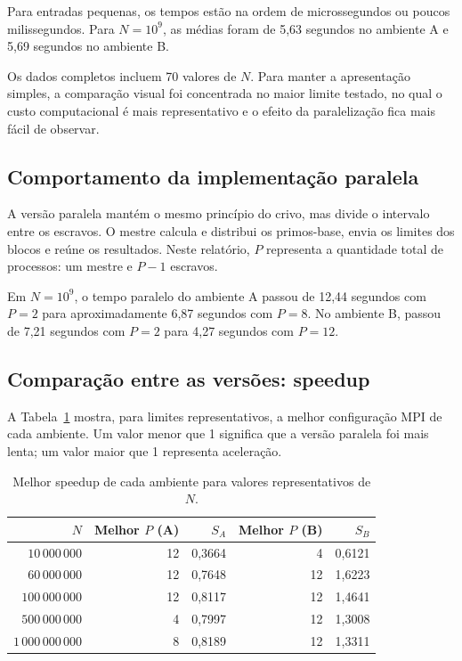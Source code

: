 \documentclass[12pt,a4paper]{article}
\begin{document}
Para entradas pequenas, os tempos estão na ordem de microssegundos ou poucos
milissegundos. Para $N=10^9$, as médias foram de 5,63 segundos no ambiente A e
5,69 segundos no ambiente B.

Os dados completos incluem 70 valores de $N$. Para manter a apresentação
simples, a comparação visual foi concentrada no maior limite testado, no qual
o custo computacional é mais representativo e o efeito da paralelização fica
mais fácil de observar.

\subsection{Comportamento da implementação paralela}

A versão paralela mantém o mesmo princípio do crivo, mas divide o intervalo
entre os escravos. O mestre calcula e distribui os primos-base, envia os
limites dos blocos e reúne os resultados. Neste relatório, $P$ representa a
quantidade total de processos: um mestre e $P-1$ escravos.

Em $N=10^9$, o tempo paralelo do ambiente A passou de 12,44 segundos com
$P=2$ para aproximadamente 6,87 segundos com $P=8$. No ambiente B, passou de
7,21 segundos com $P=2$ para 4,27 segundos com $P=12$.

\subsection{Comparação entre as versões: speedup}

A Tabela~\ref{tab:speedups} mostra, para limites representativos, a melhor
configuração MPI de cada ambiente. Um valor menor que 1 significa que a versão
paralela foi mais lenta; um valor maior que 1 representa aceleração.

\begin{table}[ht]
    \centering
    \caption{Melhor speedup de cada ambiente para valores representativos de $N$.}
    \label{tab:speedups}
    \begin{tabular}{rrrrr}
        \toprule
        \textbf{$N$} & \textbf{Melhor $P$ (A)} & \textbf{$S_A$} & \textbf{Melhor $P$ (B)} & \textbf{$S_B$} \\
        \midrule
        $10\,000\,000$ & 12 & 0,3664 & 4 & 0,6121 \\
        $60\,000\,000$ & 12 & 0,7648 & 12 & 1,6223 \\
        $100\,000\,000$ & 12 & 0,8117 & 12 & 1,4641 \\
        $500\,000\,000$ & 4 & 0,7997 & 12 & 1,3008 \\
        $1\,000\,000\,000$ & 8 & 0,8189 & 12 & 1,3311 \\
        \bottomrule
    \end{tabular}
\end{table}
\end{document}
